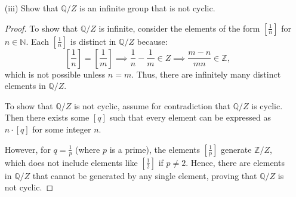 \documentclass{article}
\begin{document}
\begin{enumerate}
\begin{proof}
    \end{proof}
    
    \item[(iii)] Show that \( \mathbb{Q}/Z \) is an infinite group that is not cyclic.
    \begin{proof}
        To show that \( \mathbb{Q}/Z \) is infinite, consider the elements of the form \( \left[ \frac{1}{n} \right] \) for \( n \in \mathbb{N} \). Each \( \left[ \frac{1}{n} \right] \) is distinct in \( \mathbb{Q}/Z \) because:
    \[
    \left[ \frac{1}{n} \right] = \left[ \frac{1}{m} \right] \implies \frac{1}{n} - \frac{1}{m} \in Z \implies \frac{m - n}{mn} \in \mathbb{Z},
    \]
    which is not possible unless \( n = m \). Thus, there are infinitely many distinct elements in \( \mathbb{Q}/Z \).

    To show that \( \mathbb{Q}/Z \) is not cyclic, assume for contradiction that \( \mathbb{Q}/Z \) is cyclic. Then there exists some \( [q] \) such that every element can be expressed as \( n \cdot [q] \) for some integer \( n \).

    However, for \( q = \frac{1}{p} \) (where \( p \) is a prime), the elements \( \left[ \frac{1}{p} \right] \) generate \( \mathbb{Z}/Z \), which does not include elements like \( \left[ \frac{1}{2} \right] \) if \( p \neq 2 \). Hence, there are elements in \( \mathbb{Q}/Z \) that cannot be generated by any single element, proving that \( \mathbb{Q}/Z \) is not cyclic.
    \end{proof}
    
\end{enumerate}

\end{document}
